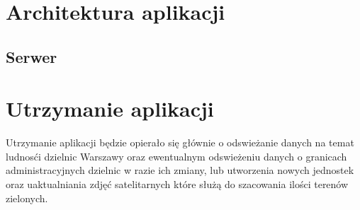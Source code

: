 \documentclass[11pt]{article}
\begin{document}
\section{Architektura aplikacji}

	\subsection{Serwer}

	\section{Utrzymanie aplikacji}
		Utrzymanie aplikacji będzie opierało się głównie o odswieżanie danych na temat ludnosći dzielnic Warszawy oraz ewentualnym odswieżeniu danych o granicach administracyjnych dzielnic w razie ich zmiany, lub utworzenia nowych jednostek oraz uaktualniania zdjęć satelitarnych które służą do szacowania ilości terenów zielonych.
\end{document}
